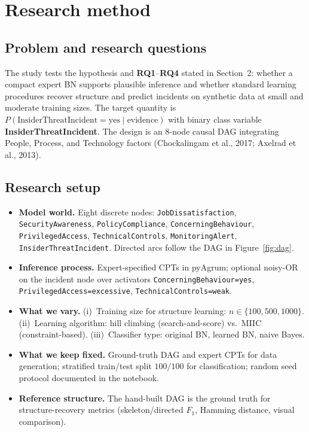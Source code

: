 \documentclass[11pt,a4paper]{article}
\begin{document}
\section{Research method}
\label{sec:research-method}

\subsection*{Problem and research questions}

The study tests the hypothesis and \textbf{RQ1}--\textbf{RQ4} stated in Section~2: whether a compact expert BN supports plausible inference and whether standard learning procedures recover structure and predict incidents on synthetic data at small and moderate training sizes. The target quantity is $P(\text{InsiderThreatIncident}=\text{yes}\mid\text{evidence})$ with binary class variable \textbf{InsiderThreatIncident}. The design is an 8-node causal DAG integrating People, Process, and Technology factors (Chockalingam et al., 2017; Axelrad et al., 2013).

\subsection*{Research setup}

\begin{itemize}[leftmargin=*]
  \item \textbf{Model world.} Eight discrete nodes: \texttt{JobDissatisfaction}, \texttt{SecurityAwareness}, \texttt{PolicyCompliance}, \texttt{ConcerningBehaviour}, \texttt{PrivilegedAccess}, \texttt{TechnicalControls}, \texttt{MonitoringAlert}, \texttt{InsiderThreatIncident}. Directed arcs follow the DAG in Figure~\ref{fig:dag}.
  \item \textbf{Inference process.} Expert-specified CPTs in pyAgrum; optional noisy-OR on the incident node over activators \texttt{ConcerningBehaviour=yes}, \texttt{PrivilegedAccess=excessive}, \texttt{TechnicalControls=weak}.
  \item \textbf{What we vary.} (i)~Training size for structure learning: $n\in\{100,500,1000\}$. (ii)~Learning algorithm: hill climbing (search-and-score) vs.\ MIIC (constraint-based). (iii)~Classifier type: original BN, learned BN, naive Bayes.
  \item \textbf{What we keep fixed.} Ground-truth DAG and expert CPTs for data generation; stratified train/test split $100/100$ for classification; random seed protocol documented in the notebook.
  \item \textbf{Reference structure.} The hand-built DAG is the ground truth for structure-recovery metrics (skeleton/directed $F_1$, Hamming distance, visual comparison).
\end{itemize}
\end{document}
